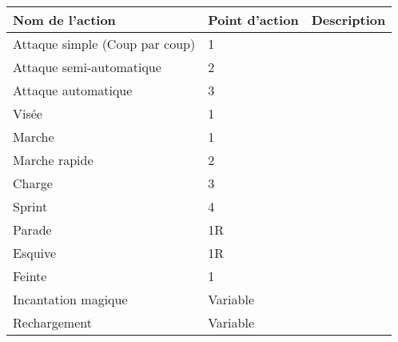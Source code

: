 \begin{tabular}{|l|l|l|}
\hline
Nom de l'action & Point d'action & Description \\ \hline
Attaque simple (Coup par coup) & 1 & \\ \hline
Attaque semi-automatique & 2 & \\ \hline
Attaque automatique & 3 & \\ \hline
Visée & 1 & \\ \hline
Marche & 1 & \\ \hline
Marche rapide & 2 & \\ \hline
Charge & 3 & \\ \hline
Sprint & 4 & \\ \hline
Parade & 1R & \\ \hline
Esquive & 1R & \\ \hline
Feinte & 1 & \\ \hline
Incantation magique & Variable & \\ \hline
Rechargement & Variable & \\ \hline


\hline
\end{tabular}
